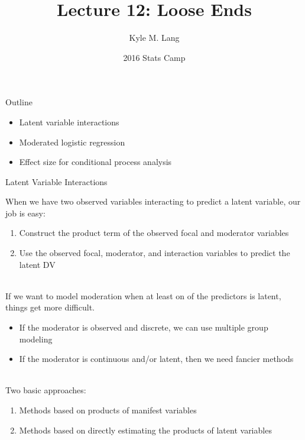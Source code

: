 \documentclass{beamer}
\title[Lecture 12]{Lecture 12: Loose Ends}
\author{Kyle M. Lang}
\institute[TTU IMMAP]{
  Institute for Measurement, Methodology, Analysis \& Policy\\
  Texas Tech University\\
  Lubbock, TX
}
\date{2016 Stats Camp}
\newcommand{\va}[0]{\vspace{12pt}}
\begin{document}




\begin{frame}[plain]
  
  \titlepage
  
\end{frame}



\begin{frame}{Outline}

  \begin{itemize}
  \item Latent variable interactions
    \va
  \item Moderated logistic regression
    \va
  \item Effect size for conditional process analysis
  \end{itemize}
  
\end{frame}


\begin{frame}[shrink = 5]{Latent Variable Interactions}
  
  When we have two observed variables interacting to predict a latent
  variable, our job is easy:
  \begin{enumerate}
    \item Construct the product term of the observed focal and
      moderator variables
    \item Use the observed focal, moderator, and interaction variables
      to predict the latent DV
  \end{enumerate}\\
  \va If we want to model moderation when at least on of the
  predictors is latent, things get more difficult.
  \begin{itemize}
  \item If the moderator is observed and discrete, we can use multiple
    group modeling
  \item If the moderator is continuous and/or latent, then we need
    fancier methods
  \end{itemize}\\
  \va
  Two basic approaches:
  \begin{enumerate}
  \item Methods based on products of manifest variables
  \item Methods based on directly estimating the products of latent
    variables
  \end{enumerate}

\end{frame}
\end{document}
